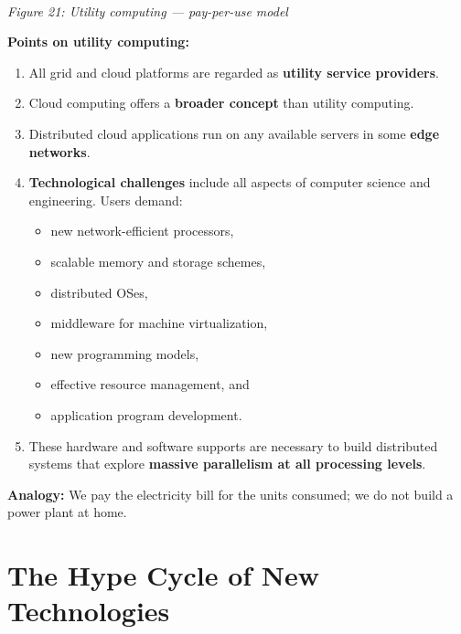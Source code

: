 \documentclass[11pt,a4paper]{article}
\newcommand{\figcap}[1]{\\[2pt]{\footnotesize\textit{#1}}}
\begin{document}
\begin{center}
\figcap{Figure 21: Utility computing --- pay-per-use model}
\end{center}

\textbf{Points on utility computing:}
\begin{enumerate}
\item All grid and cloud platforms are regarded as \textbf{utility service providers}.
\item Cloud computing offers a \textbf{broader concept} than utility computing.
\item Distributed cloud applications run on any available servers in some \textbf{edge networks}.
\item \textbf{Technological challenges} include all aspects of computer science and engineering. Users demand:
  \begin{itemize}
  \item new network-efficient processors,
  \item scalable memory and storage schemes,
  \item distributed OSes,
  \item middleware for machine virtualization,
  \item new programming models,
  \item effective resource management, and
  \item application program development.
  \end{itemize}
\item These hardware and software supports are necessary to build distributed systems that explore \textbf{massive parallelism at all processing levels}.
\end{enumerate}

\textbf{Analogy:} We pay the electricity bill for the units consumed; we do not build a power plant at home.

\section{The Hype Cycle of New Technologies}
\end{document}
